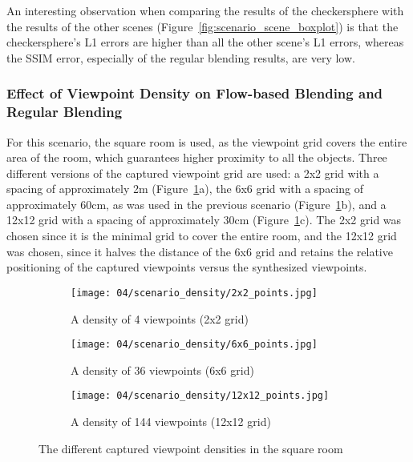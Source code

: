 An interesting observation when comparing the results of the checkersphere with the results of the other scenes (Figure~\ref{fig:scenario_scene_boxplot}) is that the checkersphere's L1 errors are higher than all the other scene's L1 errors, whereas the SSIM error, especially of the regular blending results, are very low.


\subsubsection{Effect of Viewpoint Density on Flow-based Blending and Regular Blending}
For this scenario, the square room is used, as the viewpoint grid covers the entire area of the room, which guarantees higher proximity to all the objects. Three different versions of the captured viewpoint grid are used: a 2x2 grid with a spacing of approximately 2m (Figure~\ref{fig:density_setup}a), the 6x6 grid with a spacing of approximately 60cm, as was used in the previous scenario (Figure~\ref{fig:density_setup}b), and a 12x12 grid with a spacing of approximately 30cm (Figure~\ref{fig:density_setup}c). The 2x2 grid was chosen since it is the minimal grid to cover the entire room, and the 12x12 grid was chosen, since it halves the distance of the 6x6 grid and retains the relative positioning of the captured viewpoints versus the synthesized viewpoints.

\begin{figure}
\centering
    \hfill
    \begin{subfigure}[t]{0.3\textwidth}
            \centering
            \texttt{[image: 04/scenario\_density/2x2\_points.jpg]}
            \caption{A density of 4 viewpoints (2x2 grid)}
    \end{subfigure}
    \hfill
    \begin{subfigure}[t]{0.3\textwidth}
            \centering
            \texttt{[image: 04/scenario\_density/6x6\_points.jpg]}
            \caption{A density of 36 viewpoints (6x6 grid)}
    \end{subfigure}
    \hfill
    \begin{subfigure}[t]{0.3\textwidth}
            \centering
            \texttt{[image: 04/scenario\_density/12x12\_points.jpg]}
            \caption{A density of 144 viewpoints (12x12 grid)}
    \end{subfigure}
    \hfill
  \caption{The different captured viewpoint densities in the square room} \label{fig:density_setup}
\end{figure}

